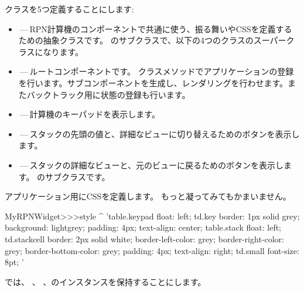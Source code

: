 \documentclass[a4paper,10pt,twoside]{book}
\begin{document}
クラスを5つ定義することにします:
\begin{itemize}
  \item {}\,---\,RPN計算機のコンポーネントで共通に使う、振る舞いやCSSを定義するための抽象クラスです。
    のサブクラスで、以下の4つのクラスのスーパークラスになります。

  \item {}\,---\,ルートコンポーネントです。
    クラスメソッドでアプリケーションの登録を行います。サブコンポーネントを生成し、レンダリングを行わせます。またバックトラック用に状態の登録も行います。
  \item {}\,---\,計算機のキーパッドを表示します。
  \item {}\,---\,スタックの先頭の値と、詳細なビューに切り替えるためのボタンを表示します。
  \item {}\,---\,スタックの詳細なビューと、元のビューに戻るためのボタンを表示します。
    のサブクラスです。
\end{itemize}


アプリケーション用にCSSを定義します。
もっと凝ってみてもかまいません。
\begin{code}{}
MyRPNWidget>>>style
	^ 'table.keypad { float: left; }
td.key {
	border: 1px solid grey;
	background: lightgrey;
	padding: 4px;
	text-align: center;
}
table.stack { float: left; }
td.stackcell {
	border: 2px solid white;
	border-left-color: grey;
	border-right-color: grey;
	border-bottom-color: grey;
	padding: 4px;
	text-align: right;
}
td.small { font-size: 8pt; }'
\end{code}


 では、 、 、のインスタンスを保持することにします。

\end{document}
